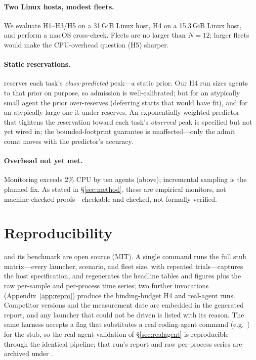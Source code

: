 \paragraph{Two Linux hosts, modest fleets.} We evaluate H1--H3/H5 on a 31\,GiB Linux host, H4 on a
15.3\,GiB Linux host, and perform a macOS cross-check. Fleets are no larger than $N{=}12$; larger
fleets would make the CPU-overhead question (H5) sharper.

\paragraph{Static reservations.} \sys{} reserves each task's \emph{class-predicted} peak---a static
prior. Our H4 run sizes agents to that prior on purpose, so admission is well-calibrated; but for an
atypically small agent the prior over-reserves (deferring starts that would have fit), and for an
atypically large one it under-reserves. An exponentially-weighted predictor that tightens the
reservation toward each task's \emph{observed} peak is specified but not yet wired in; the
bounded-footprint guarantee is unaffected---only the admit count moves with the predictor's accuracy.

\paragraph{Overhead not yet met.} Monitoring exceeds 2\% CPU by ten agents (above); incremental
sampling is the planned fix. As stated in \S\ref{sec:method}, these are empirical monitors, not
machine-checked proofs---checkable and checked, not formally verified.

\section{Reproducibility}
\label{sec:repro}

\sys{} and its benchmark are open source (MIT).\repourl{} A single command runs the full stub matrix---every
launcher, scenario, and fleet size, with repeated trials---captures the host specification, and
regenerates the headline tables and figures plus the raw per-sample and per-process time series;
two further invocations (Appendix~\ref{app:repro}) produce the binding-budget H4 and real-agent runs.
Competitor versions and the measurement date are embedded in the generated report, and any launcher
that could not be driven is listed with its reason. The same harness accepts a  flag that substitutes a real coding-agent
command (e.g.\ ) for the stub, so the real-agent validation of
\S\ref{sec:realagent} is reproducible through the identical pipeline; that run's report and raw
per-process series are archived under .

